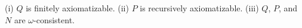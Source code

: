 (i) $Q$ is finitely axiomatizable.
(ii) $P$ is recursively axiomatizable.
(iii) $Q$, $P$, and $N$ are $\omega$-consistent.

